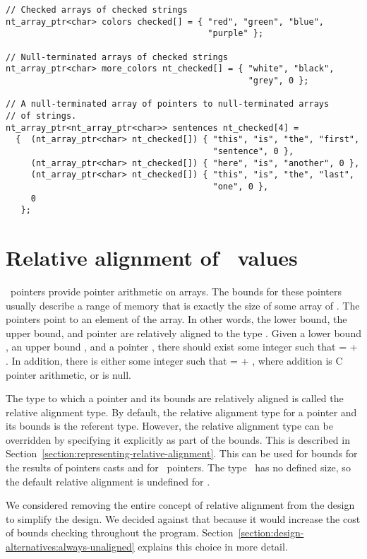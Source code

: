 \begin{lstlisting}
// Checked arrays of checked strings
nt_array_ptr<char> colors checked[] = { "red", "green", "blue",
                                        "purple" };

// Null-terminated arrays of checked strings
nt_array_ptr<char> more_colors nt_checked[] = { "white", "black",
                                                "grey", 0 };

// A null-terminated array of pointers to null-terminated arrays
// of strings.
nt_array_ptr<nt_array_ptr<char>> sentences nt_checked[4] = 
  {  (nt_array_ptr<char> nt_checked[]) { "this", "is", "the", "first",
                                         "sentence", 0 },
     (nt_array_ptr<char> nt_checked[]) { "here", "is", "another", 0 },
     (nt_array_ptr<char> nt_checked[]) { "this", "is", "the", "last",
                                         "one", 0 },
     0
   };
\end{lstlisting}

\section{Relative alignment of \arrayptr\ values}
\label{section:relative-alignment}

\arrayptrT\ pointers provide
pointer arithmetic on arrays. The bounds for these pointers usually
describe a range of memory that is exactly the size of some array of .
The pointers point to an element of the array. In other words, the lower
bound, the upper bound, and pointer are  relatively aligned to the type
. Given a lower bound , an upper bound , and a
pointer , there should exist some integer  such that
 =  + . In addition, there is either some
integer  such that  =  + ,
where addition is C pointer arithmetic, or  is null.

The type to which a pointer and its bounds are relatively aligned is
called the relative alignment type. By default, the relative alignment
type for a pointer and its bounds is the referent type. However, the
relative alignment type can be overridden by specifying it explicitly as
part of the bounds.  This is described in 
Section~\ref{section:representing-relative-alignment}.
This can be used for bounds for the results of pointers casts and 
for  \arrayptrvoid\ pointers. The type
\void\ has no defined size, so the default relative alignment is
undefined for \void.

We considered removing the entire concept of relative alignment from the
design to simplify the design.  We decided against that because it would 
increase the cost of bounds checking throughout the program.  
Section~\ref{section:design-alternatives:always-unaligned} explains
this choice in more detail.

